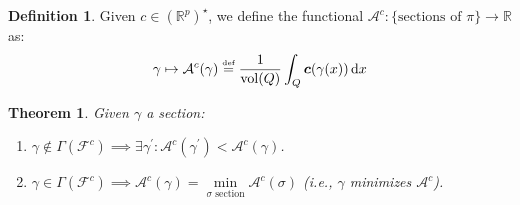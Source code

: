 \documentclass[10pt,a4paper]{article}
\DeclareMathOperator{\vol}{vol}
\def\defs{\stackrel{\tiny{\mbox{def}}}{=}}		%
\newcommand{\RR}{\mathbb{R}}
\theoremstyle{plain}
\newtheorem{theorem}{Theorem}
\theoremstyle{remark}
\theoremstyle{definition}
\newtheorem{definition}{Definition}
\begin{document}
 
\begin{definition}
	Given $c\in(\RR^p)^\star$, we define the functional 
	$\mathcal{A}^c:\{\mbox{sections of } \pi \} \to \RR$ as:
	\begin{equation}
	\gamma \mapsto \mathcal{A}^c(\gamma) 
	\defs \frac1{\vol(Q)} \int_Q \bm{c}(\gamma(x))\,\mbox{d}x
	\end{equation}
\end{definition}
\begin{theorem} \label{thm:minsections}
	Given $\gamma$ a section: 
	\begin{enumerate}
		\item $\gamma\notin\Gamma(\mathcal{F}^c)
	    \implies \exists \gamma^\prime : 
	    \mathcal{A}^c(\gamma^\prime) < \mathcal{A}^c( \gamma)$. 
	
		\item $\gamma\in\Gamma(\mathcal{F}^c) 
		\implies  \mathcal{A}^c(\gamma) = 
        \min\limits_{\sigma \text{ section}}\mathcal{A}^c(\sigma)$
        (i.e., $\gamma$ minimizes $\mathcal{A}^c$).
	
	\end{enumerate}
\end{theorem}
\end{document}
